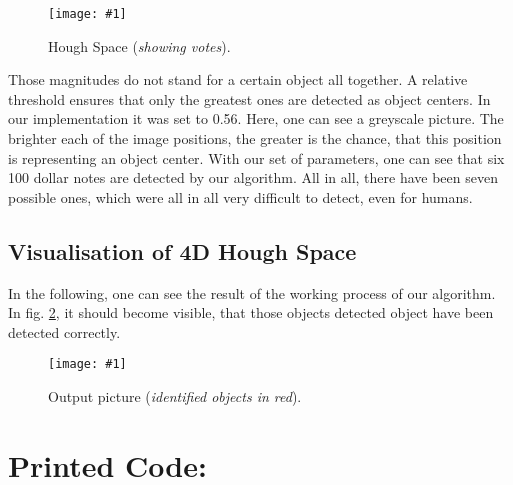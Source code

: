 \documentclass[a4paper,headings=small]{scrartcl}
\numberwithin{equation}{section} %
\numberwithin{figure}{section}   %
\newcommand{\image}[3]{
	\begin{figure}[htbp]
		\centering
		\texttt{[image: \#1]}
		\caption{#3}
		\label{fig:#1}
	\end{figure}
}
\newcommand{\generatedImgRoot}{../../../target}
\newcommand{\targetFlag}{} %
\newcommand{\objThresh}{0.56} %
\begin{document}
\image{\generatedImgRoot/\targetFlag8_Hough.png}{0.4}{%
		Hough Space (\emph{showing votes}).}

Those magnitudes do not stand for a certain object all together. 
A relative threshold ensures that only the greatest ones are detected as object centers.
In our implementation it was set to \objThresh.
Here, one can see a greyscale picture. The brighter each of the image positions,
the greater is the chance, that this position is representing an object center.
With our set of parameters, one can see that six 100 dollar notes are detected by our algorithm.
All in all, there have been seven possible ones, which were all in all very difficult
to detect, even for humans.

\subsection{Visualisation of 4D Hough Space}

In the following, one can see the result of the working process of our algorithm.
In fig. \ref{fig:\generatedImgRoot/\targetFlag10_result.png}, 
it should become visible, that those objects detected object have been detected correctly.

\image{\generatedImgRoot/\targetFlag10_result.png}{0.7}{%
		Output picture (\emph{identified objects in red}).}

\newpage
\section{Printed Code:}


\end{document}
